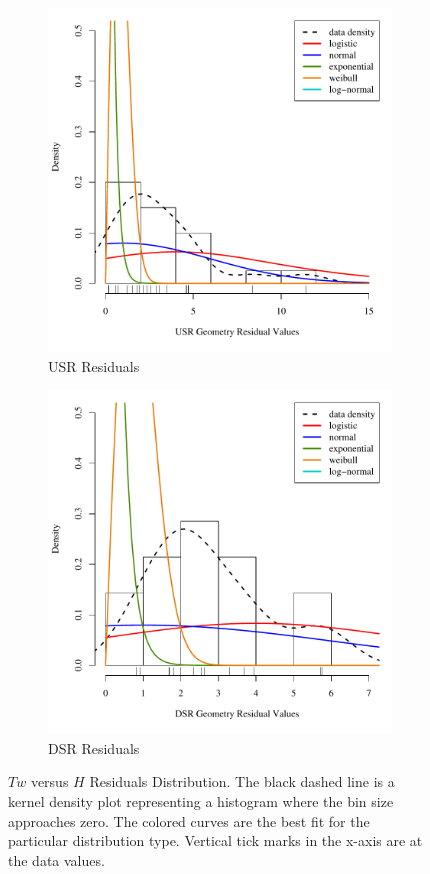 \begin{linenumbers}
\begin{figure}[htbp]
\centering
\begin{subfigure}{0.5\textwidth}
	\centering
	\includegraphics[width=0.9\linewidth]{"Figures/Results_USR/USR AB Error Dist"}
	\caption{USR Residuals}
	\label{sub b1}
\end{subfigure}%
\begin{subfigure}{0.5\textwidth}
	\centering
	\includegraphics[width=0.9\linewidth]{"Figures/Results_DSR/DSR AB Error Dist"}
	\caption{DSR Residuals}
	\label{sub b2}
\end{subfigure}
\caption[$Tw$ Versus $H$ Residuals Distribution.]{$Tw$ versus $H$ Residuals Distribution.  The black dashed line is a kernel density plot representing a histogram where the bin size approaches zero.  The colored curves are the best fit for the particular distribution type.  Vertical tick marks in the x-axis are at the data values.}
\label{fig:B1B2 Error}
\end{figure}


\end{linenumbers}
